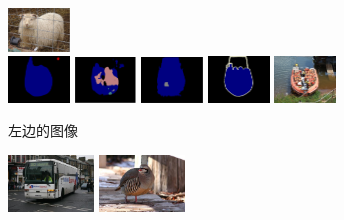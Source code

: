 \begin{figure}[h!]
\begin{subfigure}{0.55\textwidth}
		\includegraphics[width=0.18\textwidth]{image/result/compare/im_sheep.pdf}
		\\
		\includegraphics[width=0.18\textwidth]{image/result/compare/my_boat.png}
		\includegraphics[width=0.18\textwidth]{image/result/compare/fcn_boat.png}
		\includegraphics[width=0.18\textwidth]{image/result/compare/sds_boat.png}
		\includegraphics[width=0.18\textwidth]{image/result/compare/2007_004241.png}
		\includegraphics[width=0.18\textwidth]{image/result/compare/2007_004241.jpg}
		\caption{左边的图像}
		\label{fig:compare1}
	\end{subfigure}
	\begin{subfigure}{0.4\textwidth}
		\centering
		\includegraphics[width=0.25\textwidth]{image/result/compare/2010_005284.jpg}
		\includegraphics[width=0.25\textwidth]{image/result/compare/2007_003349.jpg}

\end{subfigure}
\end{figure}
